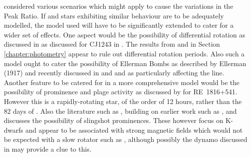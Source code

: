 {\FirstP} considered various scenarios which might apply to cause the variations in the Peak Ratio. If {\prox} and stars
exhibiting similar behaviour are to be adequately modelled, the model used will have to be significantly extended to
cater for a wider set of effects. One aspect would be the possibility of differential rotation as discussed in as
discussed for CJ1243 in \citet{davenport15}.
The results from {\hst} and {\asas} in Section \ref{chapter:photometry} appear to rule out differential rotation periods.
Also such a model ought to cater the possibility of Ellerman Bombs as described by Ellerman (1917) and recently
discussed in \citet{rutten13} and \citet{vissers15} and \citet{rutten16} as particularly affecting the {\ha} line.
Another feature to be catered for in a more comprehensive model would be the possibility of prominence and plage
activity as discussed by \citet{eibe98} for RE~1816+541. However this is a rapidly-rotating star, of the order of 12
hours, rather than the 82 days of \prox. Also the literature such as \citet{skelly09}, building on earlier work such as
\citet{donati99}, \citet{dunstone06} and \citet{colliercameron89} discusses the possibility of slingshot
prominences. These however focus on K-dwarfs and appear to be associated with strong magnetic fields which would not be
expected with a slow rotator such as \prox, although possibly the dynamo discussed in \citet{yadav16} may provide a clue
to this.


